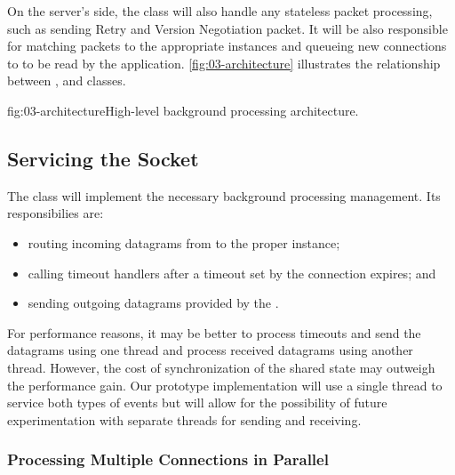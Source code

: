 On the server's side, the \QuicSocketContext{} class will also handle any stateless packet
processing, such as sending Retry and Version Negotiation packet. It will be also responsible for
matching packets to the appropriate \QuicConnection{} instances and queueing new connections to
\QuicListener{} to be read by the application. \autoref{fig:03-architecture} illustrates the
relationship between \QuicSocketContext{}, \QuicConnection{} and \QuicListener{} classes.

\begin{myFigure}{fig:03-architecture}{High-level background processing architecture.}

\resizebox{0.8\linewidth}{!}{}

\end{myFigure}

\subsection{Servicing the Socket}

The \QuicSocketContext{} class will implement the necessary background processing management. Its
responsibilies are:

\begin{itemize}

  \item routing incoming datagrams from \Socket{} to the proper \QuicConnection{} instance;

  \item calling timeout handlers after a timeout set by the connection expires; and

  \item sending outgoing datagrams provided by the \QuicConnection{}.

\end{itemize}

For performance reasons, it may be better to process timeouts and send the datagrams using one
thread and process received datagrams using another thread. However, the cost of synchronization of
the shared state may outweigh the performance gain. Our prototype implementation will use a single
thread to service both types of events but will allow for the possibility of future experimentation
with separate threads for sending and receiving.

\subsubsection{Processing Multiple Connections in Parallel}

